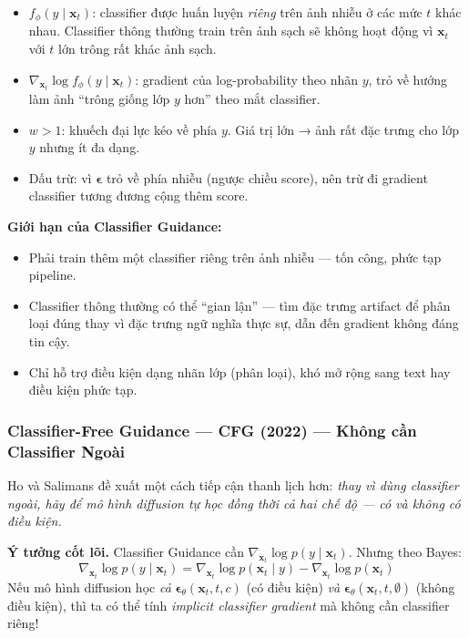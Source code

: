 \begin{itemize}
    \item $f_\phi(y \mid \mathbf{x}_t)$: classifier được huấn luyện \textit{riêng} trên ảnh nhiễu ở các mức $t$ khác nhau. Classifier thông thường train trên ảnh sạch sẽ không hoạt động vì $\mathbf{x}_t$ với $t$ lớn trông rất khác ảnh sạch.
    \item $\nabla_{\mathbf{x}_t} \log f_\phi(y \mid \mathbf{x}_t)$: gradient của log-probability theo nhãn $y$, trỏ về hướng làm ảnh ``trông giống lớp $y$ hơn'' theo mắt classifier.
    \item $w > 1$: khuếch đại lực kéo về phía $y$. Giá trị lớn → ảnh rất đặc trưng cho lớp $y$ nhưng ít đa dạng.
    \item Dấu trừ: vì $\boldsymbol{\epsilon}$ trỏ về phía nhiễu (ngược chiều score), nên trừ đi gradient classifier tương đương cộng thêm score.
\end{itemize}

\textbf{Giới hạn của Classifier Guidance:}
\begin{itemize}
    \item Phải train thêm một classifier riêng trên ảnh nhiễu --- tốn công, phức tạp pipeline.
    \item Classifier thông thường có thể ``gian lận'' --- tìm đặc trưng artifact để phân loại đúng thay vì đặc trưng ngữ nghĩa thực sự, dẫn đến gradient không đáng tin cậy.
    \item Chỉ hỗ trợ điều kiện dạng nhãn lớp (phân loại), khó mở rộng sang text hay điều kiện phức tạp.
\end{itemize}

\subsubsection{Classifier-Free Guidance --- CFG (2022) --- Không cần Classifier Ngoài}
\label{subsubsec:cfg}

Ho và Salimans \cite{Ho2022} đề xuất một cách tiếp cận thanh lịch hơn: \textit{thay vì dùng classifier ngoài, hãy để mô hình diffusion tự học đồng thời cả hai chế độ --- có và không có điều kiện.}

\textbf{Ý tưởng cốt lõi.}
Classifier Guidance cần $\nabla_{\mathbf{x}_t} \log p(y \mid \mathbf{x}_t)$. Nhưng theo Bayes:
\[
    \nabla_{\mathbf{x}_t} \log p(y \mid \mathbf{x}_t) = \nabla_{\mathbf{x}_t} \log p(\mathbf{x}_t \mid y) - \nabla_{\mathbf{x}_t} \log p(\mathbf{x}_t)
\]
Nếu mô hình diffusion học \textit{cả} $\boldsymbol{\epsilon}_\theta(\mathbf{x}_t, t, c)$ (có điều kiện) \textit{và} $\boldsymbol{\epsilon}_\theta(\mathbf{x}_t, t, \emptyset)$ (không điều kiện), thì ta có thể tính \textit{implicit classifier gradient} mà không cần classifier riêng!

